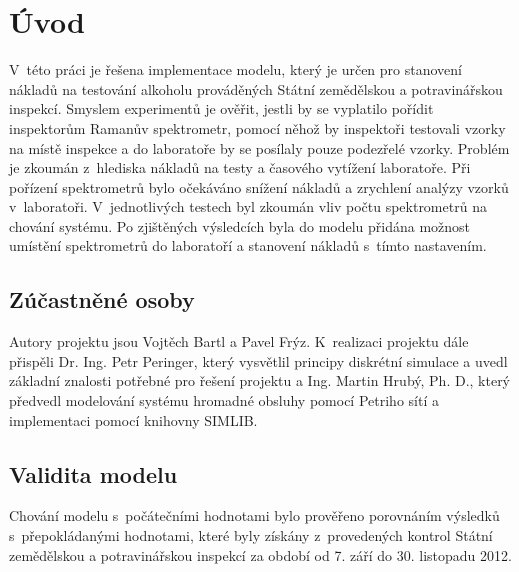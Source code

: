 \documentclass[11pt,a4paper]{article}
\begin{document}
\def\authorv{Vojtěch Bartl}
\def\emailv{xbartl03@stud.fit.vutbr.cz}
\def\authorf{Pavel Frýz}
\def\emailf{xfryzp00@stud.fit.vutbr.cz}
\def\projname{Řešení prohibiční krize v~ČR}


\tableofcontents
\newpage

\section{Úvod}
V~této práci je řešena implementace modelu, který je určen pro stanovení 
nákladů na testování alkoholu prováděných Státní zemědělskou a potravinářskou inspekcí.
Smyslem experimentů je ověřit, jestli by se vyplatilo pořídit inspektorům
Ramanův spektrometr, pomocí něhož by inspektoři testovali vzorky na místě inspekce
a do laboratoře by se posílaly pouze podezřelé vzorky. Problém je zkoumán 
z~hlediska nákladů na testy a časového vytížení laboratoře. Při pořízení spektrometrů
bylo očekáváno snížení nákladů a zrychlení analýzy vzorků v~laboratoři. V~jednotlivých
testech byl zkoumán vliv počtu spektrometrů na chování systému. Po zjištěných výsledcích
byla do modelu přidána možnost umístění spektrometrů do laboratoří a stanovení
nákladů s~tímto nastavením.   

\subsection{Zúčastněné osoby}
Autory projektu jsou Vojtěch Bartl a Pavel Frýz. K~realizaci projektu dále přispěli
Dr. Ing. Petr Peringer, který vysvětlil principy diskrétní simulace a uvedl
základní znalosti potřebné pro řešení projektu a Ing. Martin Hrubý, Ph. D., který 
předvedl modelování systému hromadné obsluhy pomocí Petriho sítí a implementaci
pomocí knihovny SIMLIB.

\subsection{Validita modelu}
Chování modelu s~počátečními hodnotami bylo prověřeno porovnáním výsledků s~přepokládanými hodnotami,
které byly získány z~provedených kontrol Státní zemědělskou a potravinářskou inspekcí za období
od 7. září do 30. listopadu 2012.
 
\end{document}
